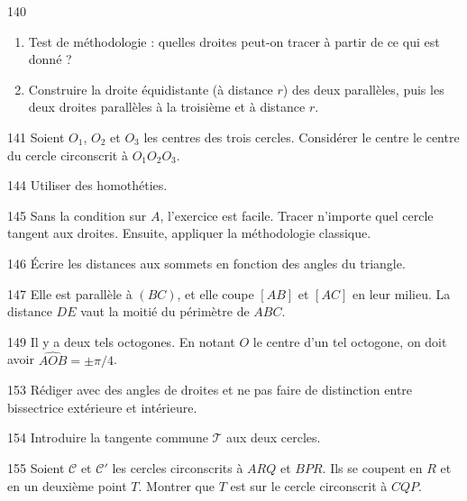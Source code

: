 \begin{Hint}{140}
\begin{enumerate}
\item Test de méthodologie : quelles droites peut-on tracer à partir de ce qui est donné ?
\item Construire la droite équidistante (à distance $r$) des deux parallèles, puis les deux droites parallèles à la troisième et à distance $r$.
\end{enumerate}
\end{Hint}
\begin{Hint}{141}
Soient $O_1$, $O_2$ et $O_3$ les centres des trois cercles. Considérer le centre le centre du cercle circonscrit à $O_1O_2O_3$. \\
\end{Hint}
\begin{Hint}{144}
Utiliser des homothéties.
\end{Hint}
\begin{Hint}{145}
Sans la condition sur $A$, l'exercice est facile. Tracer n'importe quel cercle tangent aux droites. Ensuite, appliquer la méthodologie classique. %
\end{Hint}
\begin{Hint}{146}
\'Ecrire les distances aux sommets en fonction des angles du triangle.
\end{Hint}
\begin{Hint}{147}
Elle est parallèle à $(BC)$, et elle coupe $[AB]$ et $[AC]$ en leur milieu. La distance $DE$ vaut la moitié du périmètre de $ABC$.
\end{Hint}
\begin{Hint}{149}
Il y a deux tels octogones. En notant $O$ le centre d'un tel octogone, on doit avoir $\widehat{AOB}=\pm \pi/4$.
\end{Hint}
\begin{Hint}{153}
Rédiger avec des angles de droites et ne pas faire de distinction entre bissectrice extérieure et intérieure.
\end{Hint}
\begin{Hint}{154}
Introduire la tangente commune $\mathcal T$ aux deux cercles.
\end{Hint}
\begin{Hint}{155}
Soient $\mathcal C$ et $\mathcal C'$ les cercles circonscrits à $ARQ$ et $BPR$.
Ils se coupent en $R$ et en un deuxième point $T$. Montrer que $T$ est sur le cercle circonscrit à $CQP$.
\end{Hint}
